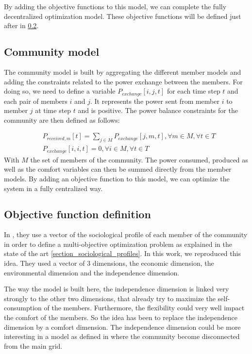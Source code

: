 By adding the objective functions to this model, we can complete the fully decentralized optimization model. These objective functions will be defined just after in \ref{objective_function}.

\subsection{Community model}
The community model is built by aggregating the different member models and adding the constraints related to the power exchange between the members. For doing so, we need to define a variable $P_{exchange}[i, j, t]$ for each time step $t$ and each pair of members $i$ and $j$. It represents the power sent from member $i$ to member $j$ at time step $t$ and is positive. The power balance constraints for the community are then defined as follows: 

\begin{align}
    &P_{received, m}[t] = \sum_{j \in M} P_{exchange}[j, m, t], \forall m \in M, \forall t \in T \\
    &P_{exchange}[i, i, t] = 0, \forall i \in M, \forall t \in T 
\end{align}
With $M$ the set of members of the community. The power consumed, produced as well as the comfort variables can then be summed directly from the member models. By adding an objective function to this model, we can optimize the system in a fully centralized way.

\subsection{Objective function definition}
\label{objective_function}

In \cite{these_sorel}, they use a vector of the sociological profile of each member of the community in order to define a multi-objective optimization problem as explained in the state of the art \ref{section_sociological_profiles}. In this work, we reproduced this idea. They used a vector of 3 dimensions, the economic dimension, the environmental dimension and the independence dimension.

The way the model is built here, the independence dimension is linked very strongly to the other two dimensions, that already try to maximize the self-consumption of the members. Furthermore, the flexibility could very well impact the comfort of the members. So the idea has been to replace the independence dimension by a comfort dimension. The independence dimension could be more interesting in a model as defined in \cite{article_5} where the community become disconnected from the main grid.

